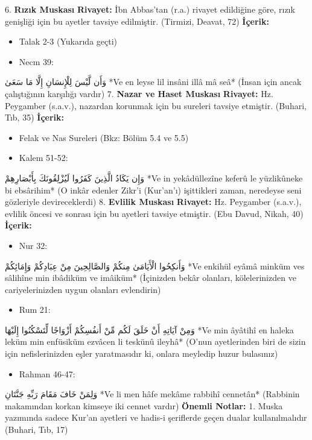 \documentclass[12pt,a4paper]{article}
\begin{document}
6. \textbf{Rızık Muskası}
\textbf{Rivayet:} İbn Abbas'tan (r.a.) rivayet edildiğine göre, rızık genişliği için bu ayetler tavsiye edilmiştir. (Tirmizi, Deavat, 72)
\textbf{İçerik:}
\begin{itemize}
\item Talak 2-3 (Yukarıda geçti)
\item Necm 39:
\end{itemize}
وَأَن لَّيْسَ لِلْإِنسَانِ إِلَّا مَا سَعَىٰ
*Ve en leyse lil insâni illâ mâ seâ*
(İnsan için ancak çalıştığının karşılığı vardır)
7. \textbf{Nazar ve Haset Muskası}
\textbf{Rivayet:} Hz. Peygamber (s.a.v.), nazardan korunmak için bu sureleri tavsiye etmiştir. (Buhari, Tıb, 35)
\textbf{İçerik:}
\begin{itemize}
\item Felak ve Nas Sureleri (Bkz: Bölüm 5.4 ve 5.5)
\item Kalem 51-52:
\end{itemize}
وَإِن يَكَادُ الَّذِينَ كَفَرُوا لَيُزْلِقُونَكَ بِأَبْصَارِهِمْ
*Ve in yekâdüllezîne keferû le yüzlikûneke bi ebsârihim*
(O inkâr edenler Zikr'i (Kur'an'ı) işittikleri zaman, neredeyse seni gözleriyle devireceklerdi)
8. \textbf{Evlilik Muskası}
\textbf{Rivayet:} Hz. Peygamber (s.a.v.), evlilik öncesi ve sonrası için bu ayetleri tavsiye etmiştir. (Ebu Davud, Nikah, 40)
\textbf{İçerik:}
\begin{itemize}
\item Nur 32:
\end{itemize}
وَأَنكِحُوا الْأَيَامَىٰ مِنكُمْ وَالصَّالِحِينَ مِنْ عِبَادِكُمْ وَإِمَائِكُمْ
*Ve enkihül eyâmâ minküm ves sâlihîne min ibâdiküm ve imâiküm*
(İçinizden bekâr olanları, kölelerinizden ve cariyelerinizden uygun olanları evlendirin)
\begin{itemize}
\item Rum 21:
\end{itemize}
وَمِنْ آيَاتِهِ أَنْ خَلَقَ لَكُم مِّنْ أَنفُسِكُمْ أَزْوَاجًا لِّتَسْكُنُوا إِلَيْهَا
*Ve min âyâtihî en haleka leküm min enfüsiküm ezvâcen li teskünû ileyhâ*
(O'nun ayetlerinden biri de sizin için nefislerinizden eşler yaratmasıdır ki, onlara meyledip huzur bulasınız)
\begin{itemize}
\item Rahman 46-47:
\end{itemize}
وَلِمَنْ خَافَ مَقَامَ رَبِّهِ جَنَّتَانِ
*Ve li men hâfe mekâme rabbihî cennetân*
(Rabbinin makamından korkan kimseye iki cennet vardır)
\textbf{Önemli Notlar:}
1. Muska yazımında sadece Kur'an ayetleri ve hadis-i şeriflerde geçen dualar kullanılmalıdır (Buhari, Tıb, 17)
\end{document}
